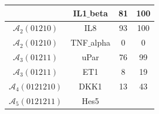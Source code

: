 \begin{table}[!t]
\begin{tabular}{|c|c||c|c|}
&

IL1$\_$beta

&

81

&

100
\\ \hline

$\mathcal{A}_{2}(01210)$

&

IL8

&

93

&

100

\\ \hline

$\mathcal{A}_{2}(01210)$

&

TNF$\_$alpha

&

0

&

0

\\ \hline

$\mathcal{A}_{3}(01211)$

&

uPar

&

76

&

99

\\ \hline

$\mathcal{A}_{3}(01211)$

&

ET1

&

8

&

19

\\ \hline

$\mathcal{A}_{4}(0121210)$

&

DKK1

&

13

&

43

\\ \hline

$\mathcal{A}_{5}(0121211)$

&

Hes5


&


\end{tabular}
\end{table}
